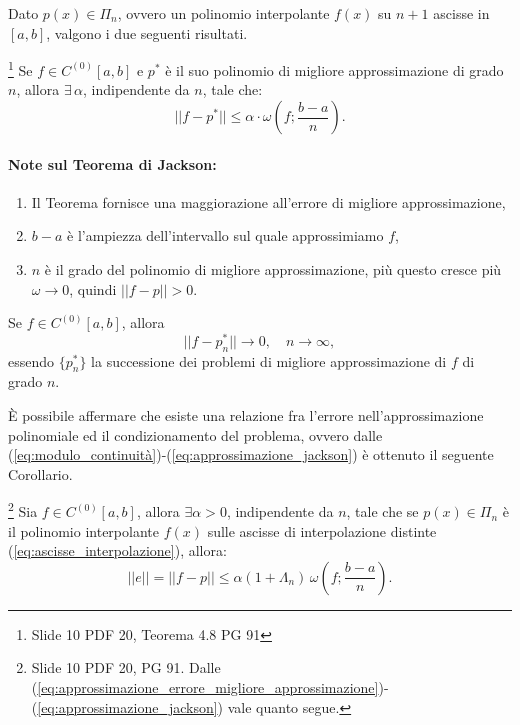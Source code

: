 Dato $p(x)\in\Pi_n$, ovvero un polinomio interpolante $f(x)$ su $n+1$ ascisse in $[a,b]$, valgono i due seguenti risultati.

\begin{theorem}[Jackson]\label{th:Jackson}\footnote{Slide 10 PDF 20, Teorema 4.8 PG 91}
    Se $f\in C^{(0)}[a,b]$ e $p^*$ è il suo polinomio di migliore approssimazione di grado $n$, allora $\exists\, \alpha$, indipendente da $n$, tale che:
    \begin{equation}\label{eq:approssimazione_jackson}
        ||f-p^*||\leq \alpha\cdot\omega\left(f;\frac{b-a}{n}\right).
    \end{equation}
\end{theorem}

\paragraph{Note sul Teorema di Jackson:}
\begin{enumerate}
	\item Il Teorema fornisce una maggiorazione all'errore di migliore approssimazione,
	\item $b-a$ è l'ampiezza dell'intervallo sul quale approssimiamo $f$,
	\item $n$ è il grado del polinomio di migliore approssimazione, più questo cresce più $\omega\rightarrow 0$, quindi $||f-p||>0$.
\end{enumerate}

\begin{corollary}
    Se $f\in C^{(0)}[a,b]$, allora
    \begin{equation*}
        ||f-p^*_n||\rightarrow 0,\quad n\rightarrow\infty,
    \end{equation*}
    essendo $\{p^*_n\}$ la successione dei problemi di migliore approssimazione di $f$ di grado $n$.
\end{corollary}

È possibile affermare che esiste una relazione fra l'errore nell'approssimazione polinomiale ed il condizionamento del problema, ovvero dalle (\ref{eq:modulo_continuità})-(\ref{eq:approssimazione_jackson}) è ottenuto il seguente Corollario.

\begin{corollary}\footnote{Slide 10 PDF 20, PG 91. Dalle (\ref{eq:approssimazione_errore_migliore_approssimazione})-(\ref{eq:approssimazione_jackson}) vale quanto segue.}
    Sia $f\in C^{(0)}[a,b]$, allora $\exists\alpha > 0$, indipendente da $n$, tale che se $p(x)\in\Pi_n$ è il polinomio interpolante $f(x)$ sulle ascisse di interpolazione distinte (\ref{eq:ascisse_interpolazione}), allora:
    \begin{equation}\label{eq:approssimazione_errore}
        \boxed{||e||=||f-p||\leq \alpha (1+\Lambda_n)\,\omega\left(f;\frac{b-a}{n}\right).}
    \end{equation}
\end{corollary}

